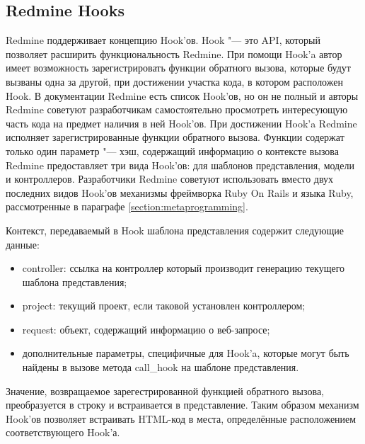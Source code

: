 \subsection{Redmine Hooks}
Redmine поддерживает концепцию Hook'ов. Hook "--- это API, который позволяет
расширить функциональность Redmine. При помощи Hook'a автор имеет возможность
зарегистрировать функции обратного вызова, которые будут вызваны одна за
другой, при достижении участка кода, в котором расположен Hook. В документации
Redmine есть список Hook'ов, но он не полный и авторы Redmine советуют
разработчикам самостоятельно просмотреть интересующую часть кода на предмет
наличия в ней Hook'ов. При достижении Hook'a Redmine исполняет
зарегистрированные функции обратного вызова. Функции содержат только один
параметр "--- хэш, содержащий информацию о контексте вызова Redmine
предоставляет три вида Hook'ов: для шаблонов представления, модели и
контроллеров. Разработчики Redmine советуют использовать вместо двух последних
видов Hook'ов механизмы фреймворка Ruby On Rails и языка Ruby, рассмотренные
в параграфе \ref{section:metaprogramming}. 

Контекст, передаваемый в Hook шаблона представления содержит следующие данные:
\begin{itemize}
  \item controller: ссылка на контроллер который производит генерацию
  текущего шаблона представления;
  \item project: текущий проект, если таковой установлен контроллером;
  \item request: объект, содержащий информацию о веб-запросе;
  \item дополнительные параметры, специфичные для Hook'a, которые могут
  быть найдены в вызове метода call\_hook на шаблоне представления.
\end{itemize}
Значение, возвращаемое зарегестрированной функцией обратного вызова,
преобразуется в строку и встраивается в представление. Таким образом механизм
Hook'ов позволяет встраивать HTML-код в места, определённые расположением
соответствующего Hook'а.

